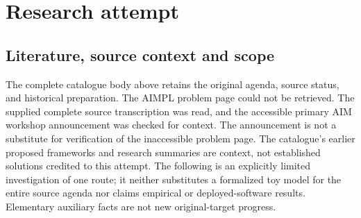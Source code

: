 \documentclass[11pt]{article}
\begin{document}
\section{Research attempt}
\subsection{Literature, source context and scope}
The complete catalogue body above retains the original agenda, source status, and historical preparation. The AIMPL problem page could not be retrieved. The supplied complete source transcription was read, and the accessible primary AIM workshop announcement was checked for context. The announcement is not a substitute for verification of the inaccessible problem page. The catalogue's earlier proposed frameworks and research summaries are context, not established solutions credited to this attempt. The following is an explicitly limited investigation of one route; it neither substitutes a formalized toy model for the entire source agenda nor claims empirical or deployed-software results. Elementary auxiliary facts are not new original-target progress.
\end{document}
